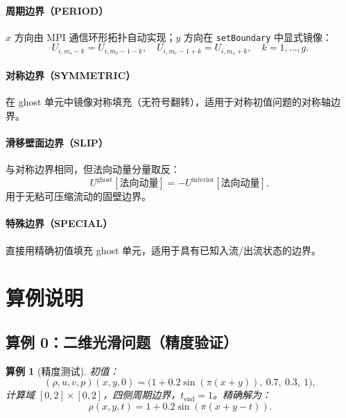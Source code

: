 \documentclass{article}
\newtheorem{example}{算例}
\numberwithin{equation}{section}
\begin{document}
\paragraph{周期边界（PERIOD）}
$x$ 方向由 MPI 通信环形拓扑自动实现；$y$ 方向在 \texttt{setBoundary} 中显式镜像：
\begin{equation}
    U_{i, m_s - k} = U_{i, m_e - 1 - k}, \quad U_{i, m_e - 1 + k} = U_{i, m_s + k}, \quad k = 1,\ldots,g.
\end{equation}

\paragraph{对称边界（SYMMETRIC）}
在 ghost 单元中镜像对称填充（无符号翻转），适用于对称初值问题的对称轴边界。

\paragraph{滑移壁面边界（SLIP）}
与对称边界相同，但法向动量分量取反：
\begin{equation}
    U^{\text{ghost}}[\text{法向动量}] = -U^{\text{interior}}[\text{法向动量}],
\end{equation}
用于无粘可压缩流动的固壁边界。

\paragraph{特殊边界（SPECIAL）}
直接用精确初值填充 ghost 单元，适用于具有已知入流/出流状态的边界。

\section{算例说明}

\subsection{算例 0：二维光滑问题（精度验证）}

\begin{example}[精度测试]\label{ex:smooth}
初值：
\begin{equation}
    (\rho, u, v, p)(x,y,0) = \bigl(1 + 0.2\sin(\pi(x+y)),\ 0.7,\ 0.3,\ 1\bigr),
\end{equation}
计算域 $[0,2]\times[0,2]$，四侧周期边界，$t_{\text{end}} = 1$。精确解为：
\begin{equation}
    \rho(x,y,t) = 1 + 0.2\sin(\pi(x + y - t)).
\end{equation}
\end{example}
\end{document}
